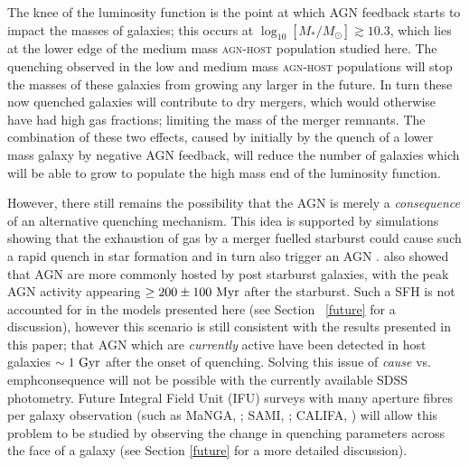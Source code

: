 The knee of the luminosity function is the point at which AGN feedback starts to impact the masses of galaxies; this occurs at $\log_{10}[M_*/M_{\odot}] \gtrsim 10.3$, which lies at the lower edge of the medium mass \textsc{agn-host} population studied here. The quenching observed in the low and medium mass \textsc{agn-host} populations will stop the masses of these galaxies from growing any larger in the future. In turn these now quenched galaxies will contribute to dry mergers, which would otherwise have had high gas fractions; limiting the mass of the merger remnants. The combination of these two effects, caused by initially by the quench of a lower mass galaxy by negative AGN feedback, will reduce the number of galaxies which will be able to grow to populate the high mass end of the luminosity function. 

However, there still remains the possibility that the AGN is merely a \emph{consequence} of an alternative quenching mechanism. This idea is supported by simulations showing that the exhaustion of gas by a merger fuelled starburst could cause such a rapid quench in star formation and in turn also trigger an AGN \citep{Croton06, Wild09, Snyder11, Hayward14}. \citet{Yesuf14} also showed that AGN are more commonly hosted by post starburst galaxies, with the peak AGN activity appearing $\geq 200 \pm 100 ~\rm{Myr}$ after the starburst. Such a SFH is not accounted for in the models presented here (see Section ~\ref{future} for a discussion), however this scenario is still consistent with the results presented in this paper; that AGN which are \emph{currently} active have been detected in host galaxies $\sim 1~\rm{Gyr}$ after the onset of quenching. Solving this issue of \emph{cause} vs. emph{consequence} will not be possible with the currently available SDSS photometry. Future Integral Field Unit (IFU) surveys with many aperture fibres per galaxy observation (such as MaNGA, \citealt{bundy15}; SAMI, \citealt{croom12}; CALIFA, \citealt{sanchez12}) will allow this problem to be studied by observing the change in quenching parameters across the face of a galaxy (see Section \ref{future} for a more detailed discussion). 
 

